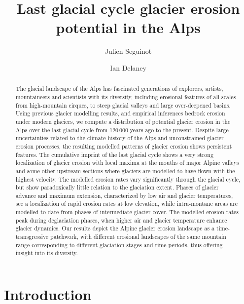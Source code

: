 \documentclass[utf8]{article}
\title{Last glacial cycle glacier erosion potential in the Alps}
\author[1]{Julien Seguinot}
\author[2]{Ian Delaney}
\affil[1]{Anafi, Greece}
\affil[2]{Institute of Earth Surface Dynamics, University of Lausanne, Switzerland}
\begin{document}

\maketitle

\begin{abstract}

    The glacial landscape of the Alps has fascinated generations of explorers,
    artists, mountaineers and scientists with its diversity, including
    erosional features of all scales from high-mountain cirques, to steep
    glacial valleys and large over-deepened basins. Using previous glacier
    modelling results, and empirical inferences bedrock erosion under modern
    glaciers, we compute a distribution of potential glacier erosion in the Alps
    over the last glacial cycle from 120\,000 years ago to the present.
    Despite large uncertainties related to the climate history of the Alps and
    unconstrained glacier erosion processes, the resulting modelled patterns of
    glacier erosion shows persistent features. The cumulative imprint of
    the last glacial cycle shows a very strong localization of glacier erosion
    with local maxima at the mouths of major Alpine valleys and some other
    upstream sections where glaciers are modelled to have flown with the
    highest velocity. The modelled erosion rates vary significantly through the
    glacial cycle, but show paradoxically little relation to the glaciation
    extent. Phases of glacier advance and maximum extension, characterized by
    low air and glacier temperatures, see a localization of rapid erosion rates
    at low elevation, while intra-montane areas are modelled to date from phases
    of intermediate glacier cover. The modelled erosion rates peak during
    deglaciation phases, when higher air and glacier temperature enhance
    glacier dynamics.
    Our results depict the Alpine glacier erosion landscape as a
    time-transgressive patchwork, with different erosional landscapes of the
    same mountain range corresponding to different glaciation stages and time
    periods, thus offering insight into its diversity.

\end{abstract}


\section{Introduction}
\end{document}
